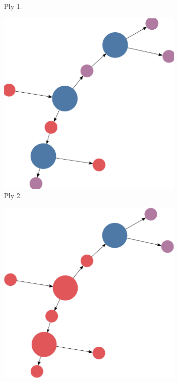 \documentclass[titlepage,11pt]{article}
\begin{document}
\begin{figure}[!htb]
\begin{subfigure}[!htb]{0.19\textwidth}
		\caption{Ply 1.}
	\end{subfigure}
	\begin{subfigure}[!htb]{0.19\textwidth}
		\centering
		\includegraphics[width=\columnwidth]{figures/knn_simple_lambda_think_2.pdf}
		\caption{Ply 2.}
	\end{subfigure}
	\begin{subfigure}[!htb]{0.19\textwidth}
		\centering
		\includegraphics[width=\columnwidth]{figures/knn_simple_lambda_think_3.pdf}

\end{subfigure}
\end{figure}
\end{document}
